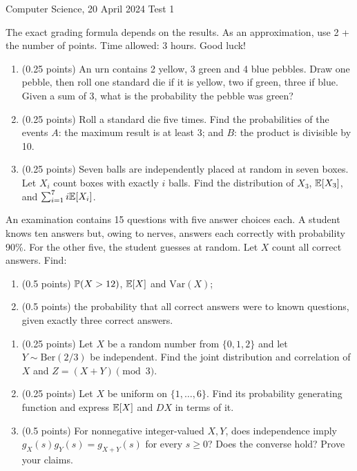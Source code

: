\documentclass[a4paper]{report}
\begin{document}
\noindent Computer Science, 20 April 2024 \hfill Test 1
\hrulefill
\begin{it}The exact grading formula depends on the results. As an approximation, use 2 + the number of points. Time allowed: 3 hours. Good luck!\end{it}
\begin{problem}
\begin{enumerate}
\item (0.25 points) An urn contains 2 yellow, 3 green and 4 blue pebbles. Draw one pebble, then roll one standard die if it is yellow, two if green, three if blue. Given a sum of 3, what is the probability the pebble was green?
\item (0.25 points) Roll a standard die five times. Find the probabilities of the events $A$: the maximum result is at least 3; and $B$: the product is divisible by 10.
\item (0.25 points) Seven balls are independently placed at random in seven boxes. Let $X_i$ count boxes with exactly $i$ balls. Find the distribution of $X_3$, $\E[X_3]$, and $\sum_{i=1}^7i\E[X_i]$.
\end{enumerate}
\end{problem}
\begin{problem}
An examination contains 15 questions with five answer choices each. A student knows ten answers but, owing to nerves, answers each correctly with probability 90\%. For the other five, the student guesses at random. Let $X$ count all correct answers. Find:
\begin{enumerate}
\item (0.5 points) $\P(X>12)$, $\E[X]$ and $\mathrm{Var}(X)$;
\item (0.5 points) the probability that all correct answers were to known questions, given exactly three correct answers.
\end{enumerate}
\end{problem}
\begin{problem}
\begin{enumerate}
\item (0.25 points) Let $X$ be a random number from $\{0,1,2\}$ and let $Y\sim\mathrm{Ber}(2/3)$ be independent. Find the joint distribution and correlation of $X$ and $Z=(X+Y)\pmod3$.
\item (0.25 points) Let $X$ be uniform on $\{1,\ldots,6\}$. Find its probability generating function and express $\E[X]$ and $DX$ in terms of it.
\item (0.5 points) For nonnegative integer-valued $X,Y$, does independence imply $g_X(s)g_Y(s)=g_{X+Y}(s)$ for every $s\geq0$? Does the converse hold? Prove your claims.
\end{enumerate}
\end{problem}
\end{document}
